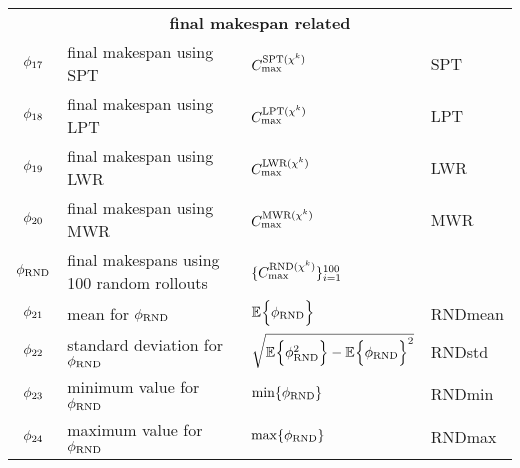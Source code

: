 {\begin{tabular}{clll}
 \midrule
 \multicolumn{4}{c}{\textbf{final makespan related}}\\
 $\phi_{17}$ & final makespan using SPT & $ C_{\max}^{\text{SPT}({\mathbf{\chi}}^k)}$ & SPT \\
 $\phi_{18}$ & final makespan using LPT & $ C_{\max}^{\text{LPT}({\mathbf{\chi}}^k)}$ & LPT \\
 $\phi_{19}$ & final makespan using LWR & $ C_{\max}^{\text{LWR}({\mathbf{\chi}}^k)}$ & LWR \\
 $\phi_{20}$ & final makespan using MWR & $ C_{\max}^{\text{MWR}({\mathbf{\chi}}^k)}$ & MWR \\
 $\phi_{\text{RND}}$ & final makespans using 100 random rollouts & $ 
 \{C_{\max}^{\text{RND}({\mathbf{\chi}}^k)}\}_{i=1}^{100}$ & \\ 
 $\phi_{21}$ & mean for $\phi_{\text{RND}}$ & ${\mathbb E}_{ }\Big\{\phi_{\text{RND}}\Big\}$ & RNDmean \\ 
 $\phi_{22}$ & standard deviation for $\phi_{\text{RND}}$ & 
 $\sqrt{{\mathbb E}_{ }\Big\{\phi_{\text{RND}}^2\Big\}-{\mathbb E}_{ }\Big\{\phi_{\text{RND}}\Big\}^2}$ & RNDstd \\
 $\phi_{23}$ & minimum value for $\phi_{\text{RND}}$ & $\min\{\phi_{\text{RND}}\}$ & RNDmin \\ 
 $\phi_{24}$ & maximum value for $\phi_{\text{RND}}$ & $\max\{\phi_{\text{RND}}\}$ & RNDmax \\ 
 \bottomrule
 \end{tabular}
}
